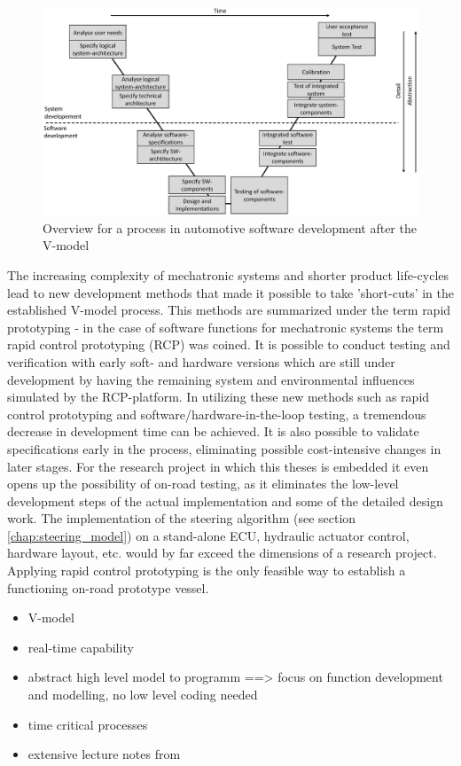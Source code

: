 \documentclass[ExampleMasters.tex]{subfiles}
\begin{document}
\begin{figure}[htpb]
	\centering
	\includegraphics[width=0.9\linewidth]{figures/v_model/Folie1}
	\caption{Overview for a process in automotive software development after the V-model}
	\label{fig:v_model}
\end{figure}



The increasing complexity of mechatronic systems and shorter product life-cycles lead to new development methods that made it possible to take 'short-cuts' in the established V-model process. This methods are summarized under the term rapid prototyping - in the case of software functions for mechatronic systems the term rapid control prototyping (RCP) was coined. It is possible to conduct testing and verification with early soft- and hardware versions which are still under development by having the remaining system and environmental influences simulated by the RCP-platform. In utilizing these new methods such as rapid control prototyping and software/hardware-in-the-loop testing, a tremendous decrease in development time can be achieved. It is also possible to validate specifications early in the process, eliminating possible cost-intensive changes in later stages.\cite{rapidcontrolprototyping} For the research project in which this theses is embedded it even opens up the possibility of on-road testing, as it eliminates the low-level development steps of the actual implementation and some of the detailed design work. The implementation of the steering algorithm (see section \ref{chap:steering_model}) on a stand-alone ECU, hydraulic actuator control, hardware layout, etc. would by far exceed the dimensions of a research project. Applying rapid control prototyping is the only feasible way to establish a functioning on-road prototype vessel.


\begin{itemize}
	\item V-model
	\item real-time capability
	\item abstract high level model to programm ==> focus on function development and modelling, no low level coding needed
	\item time critical processes
	\item extensive lecture notes from \cite{rapidcontrolprototyping}
\end{itemize}
\end{document}
